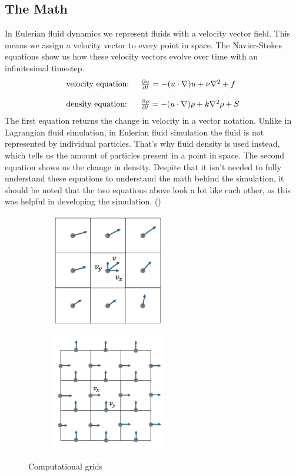 \documentclass[a4paper,12pt,titlepage]{article}
\begin{document}
\subsection{The Math} \label{math}
In Eulerian fluid dynamics we represent fluids with a velocity vector field. This means we assign a velocity vector to every point in space.
The Navier-Stokes equations show us how these velocity vectors evolve over time with an infinitesimal timestep.
\[
	\begin{array}{ll}
		\text{velocity equation: } & \pdv{u}{t} = -(u \cdot \nabla)u + \nu\nabla^2 + f \\
		\\
		\text{density equation: } & \pdv{\rho}{t} = -(u \cdot \nabla)\rho + k\nabla^2\rho + S
	\end{array}
\]
The first equation returns the change in velocity in a vector notation. 
Unlike in Lagrangian fluid simulation, in Eulerian fluid simulation the fluid is not represented by individual particles. 
That's why fluid density is used instead, which tells us the amount of particles present in a point in space. 
The second equation shows us the change in density. 
Despite that it isn't needed to fully understand these equations to understand
the math behind the simulation, it should be noted that the two equations above look
a lot like each other, as this was helpful in developing the simulation. (\cite{josstam})

\begin{figure}[H]
	\centering
	\begin{subfigure}[t]{0.45\textwidth}
		\centering
		\includegraphics[width=5cm]{resources/collocated_grid_2.png}
	\end{subfigure}
	\hfill
	\begin{subfigure}[t]{0.45\textwidth}
		\centering
		\includegraphics[width=5cm]{resources/staggered_grid_2.png}
	\end{subfigure}
	\caption{Computational grids}
\end{figure}
\end{document}
